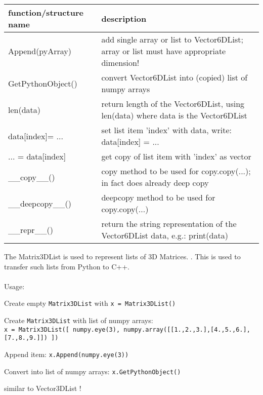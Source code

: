 \begin{center}
\footnotesize
\begin{longtable}{| p{8cm} | p{8cm} |} 
\hline
{\bf function/structure name} & {\bf description}\\ \hline
  Append(pyArray) & add single array or list to Vector6DList; array or list must have appropriate dimension!\\ \hline 
  GetPythonObject() & convert Vector6DList into (copied) list of numpy arrays\\ \hline 
  len(data) & return length of the Vector6DList, using len(data) where data is the Vector6DList\\ \hline 
  data[index]= ... & set list item 'index' with data, write: data[index] = ...\\ \hline 
  ... = data[index] & get copy of list item with 'index' as vector\\ \hline 
  \_\_copy\_\_() & copy method to be used for copy.copy(...); in fact does already deep copy\\ \hline 
  \_\_deepcopy\_\_() & deepcopy method to be used for copy.copy(...)\\ \hline 
  \_\_repr\_\_() & return the string representation of the Vector6DList data, e.g.: print(data)\\ \hline 
\end{longtable}
\end{center}

The Matrix3DList is used to represent lists of 3D Matrices. . This is used to transfer such lists from Python to C++. \\ \\ Usage: \bi
  \item Create empty \texttt{Matrix3DList} with \texttt{x = Matrix3DList()} 
  \item Create \texttt{Matrix3DList} with list of numpy arrays:\\\texttt{x = Matrix3DList([ numpy.eye(3), numpy.array([[1.,2.,3.],[4.,5.,6.],[7.,8.,9.]]) ])}
  \item Append item: \texttt{x.Append(numpy.eye(3))}
  \item Convert into list of numpy arrays: \texttt{x.GetPythonObject()}
  \item similar to Vector3DList !
\ei


